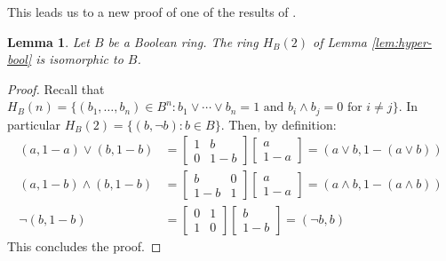 \documentclass{amsart}
\numberwithin{equation}{section}
\theoremstyle{plain}
\newtheorem{lemma}[theorem]{Lemma}
\theoremstyle{definition}
\begin{document}
This leads us to a new proof of one of the results of \cite[Theorem 4.9]{G24}.

\begin{lemma}
  \label{lem:iso}
  Let $B$ be a Boolean ring. 
  The ring $H_B(2)$ of Lemma \ref{lem:hyper-bool} 
  is isomorphic to $B$. 
\end{lemma}
\begin{proof}
    Recall that $H_B(n)=\{(b_1, \ldots, b_n) \in B^n : b_1 \lor \cdots \lor b_n =1 \text{ and } b_i \land b_j =0 \text{ for } i \neq j\}$. 
    In particular $H_B(2) =\{(b,\lnot b) : b \in B\}$. 
    Then, by definition: 
    \begin{align*}
      (a, 1 -a) \lor (b,1- b) & = 
      \begin{bmatrix}
      1 & b \\
      0 & 1-b
      \end{bmatrix} 
      \begin{bmatrix}
      a \\
      1-a 
      \end{bmatrix} 
      = (a \lor b, 1-(a \lor b)) \\
      (a,1-b) \land (b,1-b) & = 
      \begin{bmatrix}
      b & 0 \\
      1-b & 1 
      \end{bmatrix} 
      \begin{bmatrix}
      a \\
      1-a 
      \end{bmatrix} = 
      (a \land b, 1-(a \land b)) \\
      \lnot (b,1-b) & = 
      \begin{bmatrix}
      0 & 1\\
      1 & 0
      \end{bmatrix} 
      \begin{bmatrix}
      b \\
      1-b
      \end{bmatrix} = 
      (\lnot b, b) 
    \end{align*}
    This concludes the proof. 
\end{proof}
\end{document}

